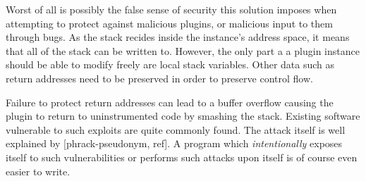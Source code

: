 Worst of all is possibly the false sense of security this solution imposes when
attempting to protect against malicious plugins, or malicious input to them
through bugs. As the stack recides inside the instance's address space, it means
that all of the stack can be written to. However, the only part a a plugin
instance should be able to modify freely are local stack variables. Other data
such as return addresses need to be preserved in order to preserve control flow.

Failure to protect return addresses can lead to a buffer overflow causing the
plugin to return to uninstrumented code by smashing the stack. Existing software
vulnerable to such exploits are quite commonly found. The attack itself is well
explained by  [phrack-pseudonym, ref]. A program which \emph{intentionally}
exposes itself to such vulnerabilities or performs such attacks upon itself is
of course even easier to write.
